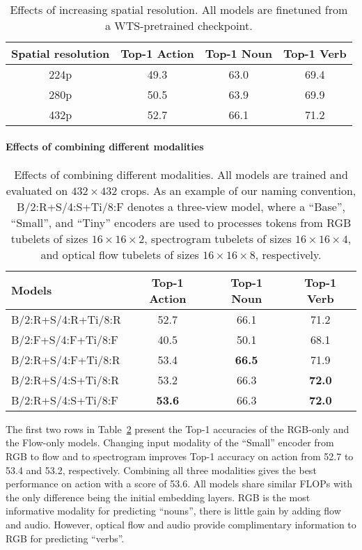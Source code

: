 \begin{table} 
	\centering
	\scriptsize{
\begin{tabular}{  c  c  c  c }
    \toprule
    Spatial resolution & Top-1 Action & Top-1 Noun & Top-1 Verb \\
    \midrule
    224p & 49.3 & 63.0 & 69.4 \\
    280p & 50.5 & 63.9 & 69.9 \\
    432p & 52.7 & 66.1 & 71.2 \\
    \bottomrule
   \end{tabular}
   }
	\caption{Effects of increasing spatial resolution. All models are finetuned from a WTS-pretrained checkpoint.}
\label{tab:resolution}
\end{table}
 
\paragraph{Effects of combining different modalities}
\begin{table} 
	\centering
	\scriptsize{
\begin{tabular}{  l  c  c  c }
    \toprule
    Models & Top-1 Action & Top-1 Noun & Top-1 Verb \\
    \midrule
    B/2:R+S/4:R+Ti/8:R & 52.7 & 66.1 & 71.2 \\
    B/2:F+S/4:F+Ti/8:F & 40.5 & 50.1 & 68.1 \\
    \midrule
    B/2:R+S/4:F+Ti/8:R & 53.4 & \bf{66.5} & 71.9 \\
    B/2:R+S/4:S+Ti/8:R & 53.2 & 66.3 & \bf{72.0} \\
    \midrule
    B/2:R+S/4:S+Ti/8:F & \bf{53.6} & 66.3 & \bf{72.0} \\
    \bottomrule
   \end{tabular}
   }
	\caption{Effects of combining different modalities. All models are trained and evaluated on $432\times432$ crops.
	As an example of our naming convention, B/2:R+S/4:S+Ti/8:F denotes a three-view model, where a ``Base'', ``Small'', and ``Tiny'' encoders are used to processes tokens from RGB tubelets of sizes $16\times16\times2$, spectrogram tubelets of sizes $16\times16\times4$, and optical flow tubelets of sizes $16\times16\times8$, respectively.
}
\label{tab:modalities}
\end{table}
 The first two rows in Table~\ref{tab:modalities} present the Top-1 accuracies of the RGB-only and the Flow-only models. Changing input modality of the ``Small'' encoder from RGB to flow and to spectrogram improves Top-1 accuracy on action from 52.7 to 53.4 and 53.2, respectively. Combining all three modalities gives the best performance on action with a score of 53.6. All models share similar FLOPs with the only difference being the initial embedding layers. RGB is the most informative modality for predicting ``nouns'', there is little gain by adding flow and audio. 
However, optical flow and audio provide complimentary information to RGB for predicting ``verbs''.
 
